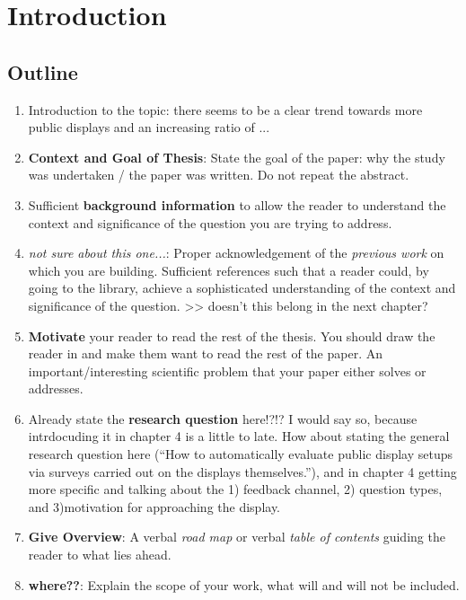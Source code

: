 \section{Introduction}
\label{sec:introduction}


\subsection{Outline}

  
	\begin{enumerate}

	\item Introduction to the topic: there seems to be a clear trend towards more public displays and an increasing ratio of ...

	\item \textbf{Context and Goal of Thesis}: State the goal of the paper: why the study was undertaken / the paper was written. Do not repeat the abstract. 

	\item Sufficient \textbf{background information} to allow the reader to understand the context and significance of the question you are trying to address. 

	\item \textit{not sure about this one...}: Proper acknowledgement of the \textit{previous work} on which you are building. Sufficient references such that a reader could, by going to the library, achieve a sophisticated understanding of the context and significance of the question.  >> doesn't this belong in the next chapter?


	\item \textbf{Motivate} your reader to read the rest of the thesis. You should draw the reader in and make them want to read the rest of the paper. An important/interesting scientific problem that your paper either solves or addresses.

	\item Already state the \textbf{research question} here!?!? I would say so, because intrdocuding it in chapter 4 is a little to late. How about stating the general research question here (``How to automatically evaluate public display setups via surveys carried out on the displays themselves.''), and in chapter 4 getting more specific and talking about the 1) feedback channel, 2) question types, and 3)motivation for approaching the display.

	\item \textbf{Give Overview}: A verbal \textit{road map} or verbal \textit{table of contents} guiding the reader to what lies ahead. 

	\item \textbf{where??}: Explain the scope of your work, what will and will not be included. 
	\end{enumerate}




